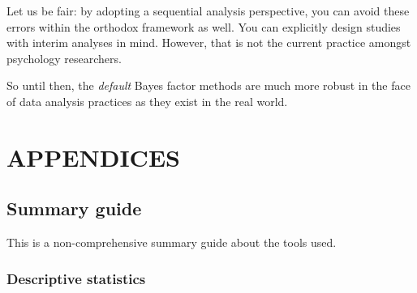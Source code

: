 \documentclass[
  11pt,
  a4paper,
  twoside,symmetric,openright]{book}
\theoremstyle{break}
\theoremstyle{break}
\begin{document}
Let us be fair: by adopting a sequential analysis perspective, you can avoid these errors within the orthodox framework as well. You can explicitly design studies with interim analyses in mind. However, that is not the current practice amongst psychology researchers.

So until then, the \emph{default} Bayes factor methods are much more robust in the face of data analysis practices as they exist in the real world.

\part*{APPENDICES}\label{part-appendices}

\chapter{Summary guide}\label{summaryguide}

This is a non-comprehensive summary guide about the tools used.

\section*{Descriptive statistics}\label{descriptive-statistics}
\end{document}
